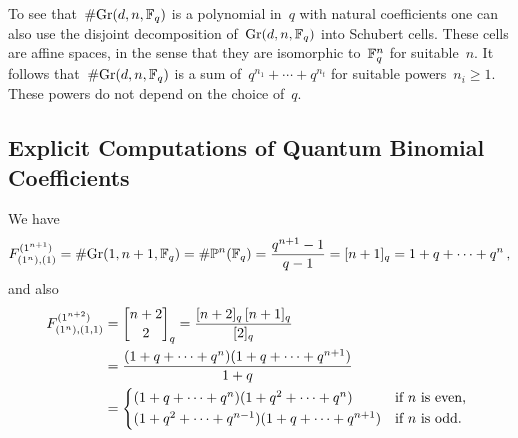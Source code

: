 \documentclass[a4paper, 11pt, twoside=semi]{scrartcl}
\begin{document}
\begin{remark}
  To see that~$\# {\operatorname{Gr}(d, n, \mathbb{F}_q)}$ is a polynomial in~$q$ with natural coefficients one can also use the disjoint decomposition of~$\operatorname{Gr}(d, n, \mathbb{F}_q)$ into Schubert cells.
  These cells are affine spaces, in the sense that they are isomorphic to~$\mathbb{F}_q^n$ for suitable~$n$.
  It follows that~$\#{\operatorname{Gr}(d, n, \mathbb{F}_q)}$ is a sum of~$q^{n_1} + \dotsb + q^{n_t}$ for suitable powers~$n_i \geq 1$.
  These powers do not depend on the choice of~$q$.
\end{remark}


\subsection{Explicit Computations of Quantum Binomial Coefficients}
\label{examples of quantum binomial coefficients}

We have
\[
  F^{(1^{n+1})}_{(1^n),(1)}
  =
  \# {\operatorname{Gr}(1, n+1, \mathbb{F}_q)}
  = 
  \# {\mathbb{P}^n(\mathbb{F}_q)}
  =
  \frac{ q^{n+1} - 1 }{ q - 1 }
  =
  [n+1]_q
  =
  1 + q + \dotsb + q^n \,,
\]
and also
\begin{align*}
  F^{(1^{n+2})}_{(1^n),(1,1)}
  &=
  \qbinom{n+2}{2}_q
  =
  \frac{[n+2]_q \, [n+1]_q}{[2]_q}
  \\
  &=
  \frac{ (1 + q + \dotsb + q^n) (1 + q + \dotsb + q^{n+1}) }{ 1 + q }
  \\
  &=
  \begin{cases*}
    (1 + q + \dotsb + q^n) (1 + q^2 + \dotsb + q^n)
    &
    if~$n$ is even,
    \\
    (1 + q^2 + \dotsb + q^{n-1}) (1 + q + \dotsb + q^{n+1})
    &
    if~$n$ is odd.
  \end{cases*}
\end{align*}
\end{document}
